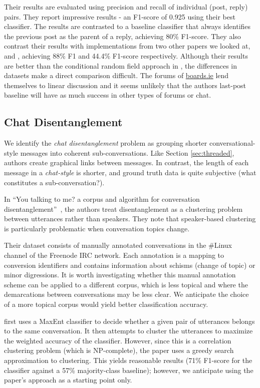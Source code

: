 \documentclass[11pt]{article}
\newcommand{\titlecite}[2]{``#1''~\cite{#2}}
\begin{document}
Their results are evaluated using precision and recall of individual
(post, reply) pairs. They report impressive results - an F1-score of 0.925 using their best
classifier. The results are contrasted to a baseline classifier that always
identifies the previous post as the parent of a reply, achieving 80\% F1-score. 
They also contrast their results with implementations from two other papers we looked at,
\cite{Elsner2008a} and \cite{Wang2008a}, achieving 88\% F1 and 44.4\% F1-score
respectively. Although their results are better than the conditional random field approach 
in \cite{Wang2011a}, the differences in datasets make a direct comparison difficult.
The forums of \url{boards.ie} lend themselves to linear discussion and it seems
unlikely that the authors last-post baseline will have as much success in 
other types of forums or chat.

\subsection{Chat Disentanglement}
\label{sec:chat}
We identify the \textit{chat disentanglement} problem as grouping
shorter conversational-style messages into coherent sub-conversations. Like 
Section \ref{sec:threaded}, authors create graphical links between messages. 
In contrast, the length of each message in a \textit{chat-style} is shorter, 
and ground truth data is quite subjective (what constitutes a sub-conversation?).

In \titlecite{You talking to me? a corpus and algorithm for conversation
disentanglement}{Elsner2008a}, the authors treat disentanglement as a clustering problem between 
utterances rather than speakers. They note that speaker-based clustering is
particularly problematic when conversation topics change.

Their dataset consists of manually annotated conversations in the \#Linux channel of 
the Freenode IRC network. Each annotation is a mapping to conversion identifiers
and contains information about schisms (change of 
topic) or minor digressions. It is worth investigating whether this 
manual annotation scheme can be applied to a different corpus, 
which is less topical and where the demarcations between conversations 
may be less clear. We anticipate the choice
of a more topical corpus would yield better classification accuracy.

\cite{Elsner2008a} first uses a MaxEnt classifier to decide whether a given pair of
utterances belongs to the same conversation. It then attempts to cluster the
utterances to maximize the weighted accuracy of the classifier. However, since
this is a correlation clustering problem (which is NP-complete), the paper uses
a greedy search approximation to clustering. This yields reasonable
results (71\% F1-score for the classifier against a 57\% majority-class baseline); 
however, we anticipate using the paper's approach as a starting point only.
\end{document}
